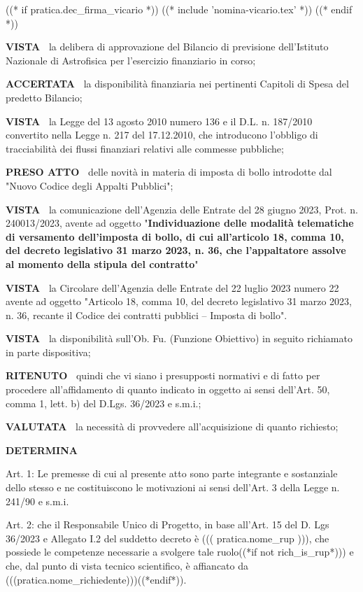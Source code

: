 ((* if pratica.dec_firma_vicario *))
((* include 'nomina-vicario.tex' *))
((* endif *))

\textbf{VISTA~}	la delibera di approvazione del Bilancio di previsione
dell'Istituto Nazionale di Astrofisica per l'esercizio finanziario
 in corso;

\textbf{ACCERTATA~}	la disponibilità finanziaria nei pertinenti
Capitoli di Spesa del predetto Bilancio;

\textbf{VISTA~}	la Legge del 13 agosto 2010 numero 136	e il
D.L. n. 187/2010 convertito nella Legge n. 217 del 17.12.2010, che
introducono l'obbligo di tracciabilità dei flussi finanziari relativi
alle commesse pubbliche;

\textbf{PRESO ATTO~} delle novità in materia di imposta di bollo introdotte dal 
"Nuovo Codice degli Appalti Pubblici";


\textbf{VISTA~}	la comunicazione dell'Agenzia delle Entrate del 28
giugno 2023,  Prot. n. 240013/2023,  avente ad oggetto	"\textbf{Individuazione
delle modalità telematiche di versamento dell'imposta di bollo, di cui
all'articolo 18, comma 10, del decreto legislativo 31 marzo 2023, n. 36,
che l'appaltatore assolve al momento della stipula del contratto}"

\textbf{VISTA~}	la Circolare dell'Agenzia delle Entrate del 22 luglio
2023 numero 22 avente ad oggetto "Articolo 18, comma 10, del decreto
legislativo 31 marzo 2023, n. 36, recante il Codice dei contratti pubblici
– Imposta di bollo".

\textbf{VISTA~}	la disponibilità sull'Ob. Fu. (Funzione Obiettivo)
in seguito richiamato in parte dispositiva;

\textbf{RITENUTO~} quindi che vi siano i presupposti normativi e
di fatto per procedere all'affidamento di quanto indicato in oggetto
ai sensi dell'Art. 50, comma 1, lett. b) del D.Lgs. 36/2023 e s.m.i.;

\textbf{VALUTATA~} la necessità di provvedere all'acquisizione
di quanto richiesto;

\begin{center}
	\textbf{DETERMINA}
\end{center}

Art. 1: Le premesse di cui al presente atto sono parte integrante e
sostanziale dello stesso e ne costituiscono le motivazioni ai sensi
dell'Art. 3 della Legge n. 241/90 e s.m.i.

Art. 2: che il Responsabile Unico di Progetto, in base all'Art. 15 del
D. Lgs 36/2023 e Allegato I.2 del suddetto decreto è ((( pratica.nome_rup ))),
che possiede le competenze necessarie a svolgere tale ruolo((*if not rich_is_rup*)))
e che, dal punto di vista tecnico scientifico, è affiancato da
(((pratica.nome_richiedente)))((*endif*)).

